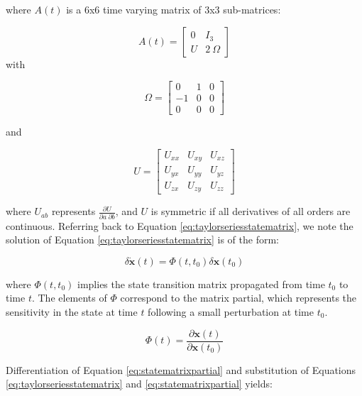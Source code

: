 where $A\left(t\right)$ is a 6x6 time varying matrix of 3x3 sub-matrices:

\begin{equation}\label{eq:jacobianequation}
A\left(t\right) = 
\begin{bmatrix}
0 & I_3 \\
U & 2~\Omega
\end{bmatrix}
\end{equation}
with

\begin{equation}
\Omega = 
\begin{bmatrix}
0 & 1 & 0 \\
-1 & 0 & 0 \\
0 & 0 & 0
\end{bmatrix}
\end{equation}

and

\begin{equation}
U = 
\begin{bmatrix}
U_{xx} & U_{xy} & U_{xz} \\
U_{yx} & U_{yy} & U_{yz} \\
U_{zx} & U_{zy} & U_{zz}
\end{bmatrix}
\end{equation}

where $U_{ab}$ represents $\frac{\partial U}{\partial a~\partial b}$, and $U$ is symmetric if all derivatives of all orders are continuous. Referring back to Equation \ref{eq:taylorseriesstatematrix}, we note the solution of Equation \ref{eq:taylorseriesstatematrix} is of the form:

\begin{equation}
\delta \pmb{\dot{x}} \left( t \right) = \Phi \left(t, t_0 \right) \delta \pmb{x} \left(t_0\right)
\end{equation}

where $\Phi \left(t, t_0 \right)$ implies the state transition matrix propagated from time $t_0$ to time $t$. The elements of $\Phi$ correspond to the matrix partial, which represents the sensitivity in the state at time $t$ following a small perturbation at time $t_0$.

\begin{equation}\label{eq:statematrixpartial}
\Phi \left( t \right) = \frac{\partial \pmb{x} \left( t \right)}{\partial \pmb{x} \left( t_0 \right)}
\end{equation}

\noindent Differentiation of Equation \ref{eq:statematrixpartial} and substitution of Equations \ref{eq:taylorseriesstatematrix} and \ref{eq:statematrixpartial} yields:

